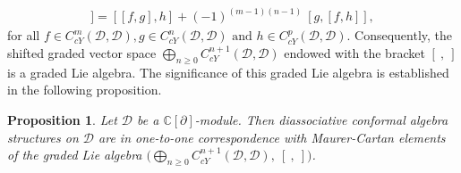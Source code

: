 \documentclass[a4paper,reqno,10pt]{amsart}
\theoremstyle{plain}
\newtheorem{proposition}[thm]{Proposition}
\theoremstyle{definition}
\theoremstyle{remark}
\newcommand{\C}{\mathbb{C}}
\newcommand{\D}{\mathcal{D}}
\newcommand{\p}{\partial}
\begin{document}
\begin{align*}
    [f,[g,h]] = [[f,g],h]+ (-1)^{(m-1)(n-1)}  ~ \! [g,[f,h]],
\end{align*}
for all $f \in C_{cY}^{m}(\D,\D), g \in C_{cY}^{n}(\D,\D) \text{ and } h \in C_{cY}^{p}(\D,\D)$. Consequently, the shifted graded vector space $\bigoplus\limits_{n \geq 0}C_{cY}^{n+1}(\D,\D)$ endowed with the bracket $[~,~]$ is a graded Lie algebra. The significance of this graded Lie algebra is established in the following proposition.

\begin{proposition} \label{1-1}
    Let $\D$ be a $\C[\p]$-module. Then diassociative conformal algebra structures on $\D$ are in {one-to-one} correspondence with Maurer-Cartan elements of the graded Lie algebra $\big( \bigoplus \limits_{n \geq 0}C_{cY}^{n+1}(\D,\D),~[~,~] \big)$.
\end{proposition}
\end{document}
